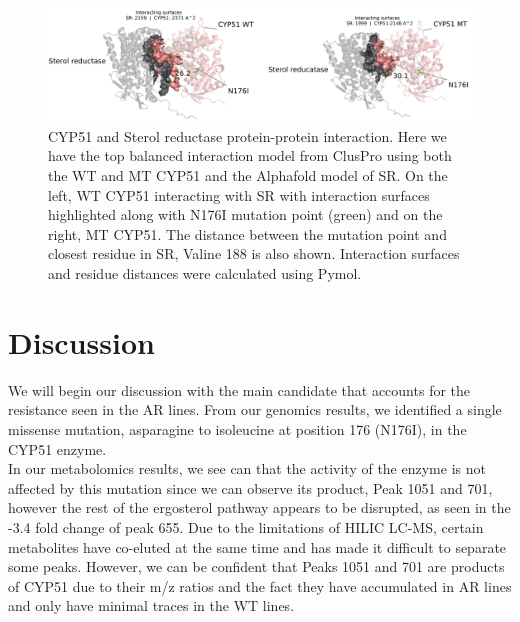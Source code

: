 \documentclass{bioinfo}
\begin{document}
\begin{figure}[ht]
\center
\includegraphics[width=\textwidth]{"p-p interactions.png"}
\caption{\label{schema}CYP51 and Sterol reductase protein-protein interaction. Here we have the top balanced interaction model from ClusPro using both the WT and MT CYP51 and the Alphafold model of SR. On the left, WT CYP51 interacting with SR with interaction surfaces highlighted along with N176I mutation point (green) and on the right, MT CYP51. The distance between the mutation point and closest residue in SR, Valine 188 is also shown. Interaction surfaces and residue distances were calculated using Pymol.}
\end{figure}

\section{Discussion}

We will begin our discussion with the main candidate that accounts for
the resistance seen in the AR lines. From our genomics results, we
identified a single missense mutation, asparagine to isoleucine at
position 176 (N176I), in the CYP51 enzyme.\\

In our metabolomics results, we see can that the activity of the enzyme
is not affected by this mutation since we can observe its product, Peak
1051 and 701, however the rest of the ergosterol pathway appears to be
disrupted, as seen in the -3.4 fold change of peak 655. Due to the
limitations of HILIC LC-MS, certain metabolites have co-eluted at the
same time and has made it difficult to separate some peaks. However, we
can be confident that Peaks 1051 and 701 are products of CYP51 due to
their m/z ratios and the fact they have accumulated in AR lines and only
have minimal traces in the WT lines.\\
\end{document}
